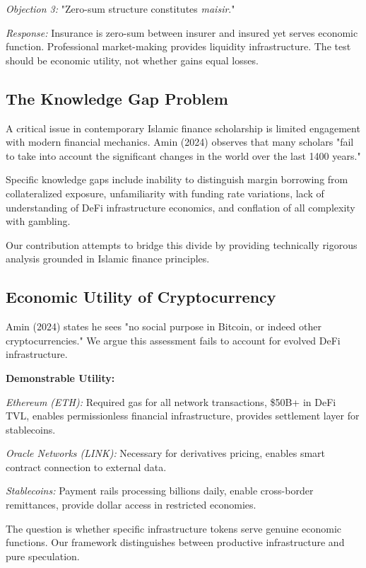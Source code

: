\documentclass[10pt,twocolumn]{article}
\begin{document}
\textit{Objection 3:} "Zero-sum structure constitutes \textit{maisir}."

\textit{Response:} Insurance is zero-sum between insurer and insured yet serves economic function. Professional market-making provides liquidity infrastructure. The test should be economic utility, not whether gains equal losses.

\subsection{The Knowledge Gap Problem}

A critical issue in contemporary Islamic finance scholarship is limited engagement with modern financial mechanics. Amin (2024) observes that many scholars "fail to take into account the significant changes in the world over the last 1400 years."

Specific knowledge gaps include inability to distinguish margin borrowing from collateralized exposure, unfamiliarity with funding rate variations, lack of understanding of DeFi infrastructure economics, and conflation of all complexity with gambling.

Our contribution attempts to bridge this divide by providing technically rigorous analysis grounded in Islamic finance principles.

\subsection{Economic Utility of Cryptocurrency}

Amin (2024) states he sees "no social purpose in Bitcoin, or indeed other cryptocurrencies." We argue this assessment fails to account for evolved DeFi infrastructure.

\textbf{Demonstrable Utility:}

\textit{Ethereum (ETH):} Required gas for all network transactions, \$50B+ in DeFi TVL, enables permissionless financial infrastructure, provides settlement layer for stablecoins.

\textit{Oracle Networks (LINK):} Necessary for derivatives pricing, enables smart contract connection to external data.

\textit{Stablecoins:} Payment rails processing billions daily, enable cross-border remittances, provide dollar access in restricted economies.

The question is whether specific infrastructure tokens serve genuine economic functions. Our framework distinguishes between productive infrastructure and pure speculation.
\end{document}
